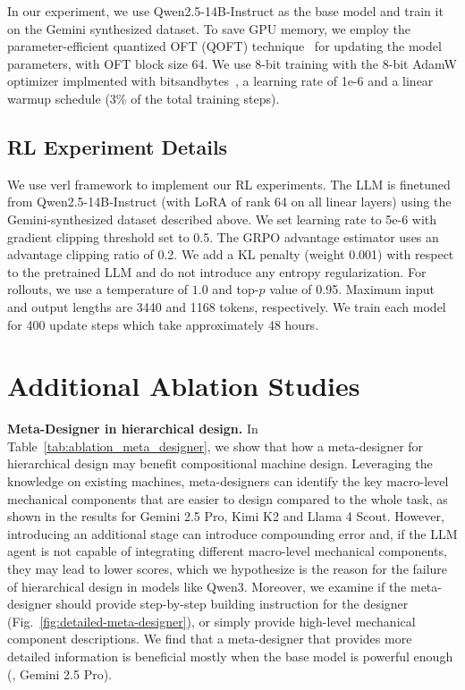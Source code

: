 In our experiment, we use Qwen2.5-14B-Instruct as the base model and train it on the Gemini synthesized dataset. To save GPU memory, we employ the parameter-efficient quantized OFT (QOFT) technique~\citep{qiu2025oftv2, qiu2023controlling, liu2024boft, qiu2025reparameterized} for updating the model parameters, with OFT block size 64. We use 8-bit training with the 8-bit AdamW optimizer implmented with bitsandbytes~\citep{dettmers20228bit}, a learning rate of 1e-6 and a linear warmup schedule (3\% of the total training steps).





\subsection{RL Experiment Details}
\label{sec:rl_exp_details}
We use verl framework to implement our RL experiments. The LLM is finetuned from Qwen2.5-14B-Instruct (with LoRA of rank 64 on all linear layers) using the Gemini-synthesized dataset described above. We set learning rate to 5e-6 with gradient clipping threshold set to 0.5. The GRPO advantage estimator uses an advantage clipping ratio of 0.2. We add a KL penalty (weight 0.001) with respect to the pretrained LLM and do not introduce any entropy regularization. For rollouts, we use a temperature of $1.0$ and top-$p$ value of 0.95. Maximum input and output lengths are 3440 and 1168 tokens, respectively. We train each model for 400 update steps which take approximately 48 hours.










\clearpage
\newpage
\section{Additional Ablation Studies}

\textbf{Meta-Designer in hierarchical design.} In Table~\ref{tab:ablation_meta_designer}, we show that how a meta-designer for hierarchical design may benefit compositional machine design. Leveraging the knowledge on existing machines, meta-designers can identify the key macro-level mechanical components that are easier to design compared to the whole task, as shown in the results for Gemini 2.5 Pro, Kimi K2 and Llama 4 Scout. However, introducing an additional stage can introduce compounding error and, if the LLM agent is not capable of integrating different macro-level mechanical components, they may lead to lower scores, which we hypothesize is the reason for the failure of hierarchical design in models like Qwen3. Moreover, we examine if the meta-designer should provide step-by-step building instruction for the designer (Fig.~\ref{fig:detailed-meta-designer}), or simply provide high-level mechanical component descriptions. We find that a meta-designer that provides more detailed information is beneficial mostly when the base model is powerful enough (\eg, Gemini 2.5 Pro).

